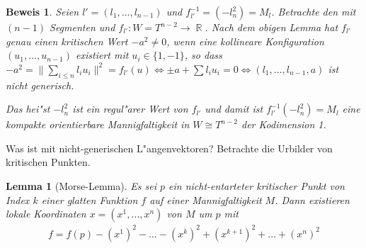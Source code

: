 \documentclass[paper=A4, twoside, chapterprefix=true, bibliography=totoc, headsepline]{scrbook}
\newcommand{\tikzgitter}[3][0.25]{ %
	\draw[step=#1,gray!15] #2 grid #3;
	\draw[step=2*#1,gray!30] #2 grid #3;
	\fill (0,0) circle(0.1); 
}
\DeclareMathOperator{\R}{\mathbb{R}}
\theoremstyle{nonumberbreak}
\newtheorem{lemma}{Lemma}
\newtheorem{bew}{Beweis}
\theoremstyle{emptybreak}
\theoremstyle{break}
\newcommand{\quot}[1]{\text{\glqq}{#1}\text{\grqq}}
\begin{document}
\begin{bew}
Seien $l' = (l_1, \ldots, l_{n-1})$ und $f_{l'}^{-1} = (-l_n^2) = M_l$.
Betrachte den \quot{Roboterarm} mit $(n-1)$ Segmenten und $f_{l'}: W = T^{n-2} \to \R$.
Nach dem obigen Lemma hat $f_{l'}$ genau einen kritischen Wert $-a^2 \ne 0$, wenn eine kollineare Konfiguration $(u_1, \ldots, u_{n-1})$ existiert mit $u_i \in \{1, -1\}$, so dass $-a^2 = \| \sum _{i \le n} l_i u_i \|^2 = f_{l'}(u) \Leftrightarrow \pm a + \sum l_i u_i = 0 \Leftrightarrow (l_1, \ldots, l_{n-1}, a)$ ist nicht generisch.

Das hei"st $-l_n^2$ ist ein regul"arer Wert von $f_{l'}$ und damit ist $f_{l'}^{-1} (-l_n^2) = M_l$ eine kompakte orientierbare Mannigfaltigkeit in $W \cong T^{n-2}$ der Kodimension 1.
\end{bew}


Was ist mit nicht-generischen L"angenvektoren?
Betrachte die Urbilder von kritischen Punkten.

\begin{lemma}[Morse-Lemma]
Es sei $p$ ein nicht-entarteter kritischer Punkt von Index $k$ einer glatten Funktion $f$ auf einer Mannigfaltigkeit $M$.
Dann existieren lokale Koordinaten $x = (x^1, \ldots, x^n)$ von $M$ um $p$ mit
\begin{align*}
	f = f(p) - (x^1)^2 - \ldots - (x^k)^2 + (x^{k+1})^2 + \ldots + (x^n)^2
\end{align*}
\end{lemma}
\end{document}

